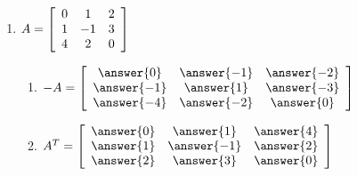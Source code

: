 \documentclass{ximera}
\begin{document}
\begin{problem}
\begin{enumerate}
\item
    $A = \startmat{ccc}
      0 & 1 & 2 \\
      1 & -1 & 3 \\
      4 & 2 & 0
    \stopmat$

    \begin{enumerate}
      \item $-A = 
      \startmat{ccc}
      \answer{0} & \answer{-1} & \answer{-2} \\
      \answer{-1} & \answer{1} & \answer{-3} \\
      \answer{-4} & \answer{-2} & \answer{0}
      \stopmat$

      \item $A^T =
      \startmat{ccc}
      \answer{0} & \answer{1} & \answer{4} \\
      \answer{1} & \answer{-1} & \answer{2} \\
      \answer{2} & \answer{3} & \answer{0}
      \stopmat$
    \end{enumerate}

  \end{enumerate}
\end{problem}
\end{document}
